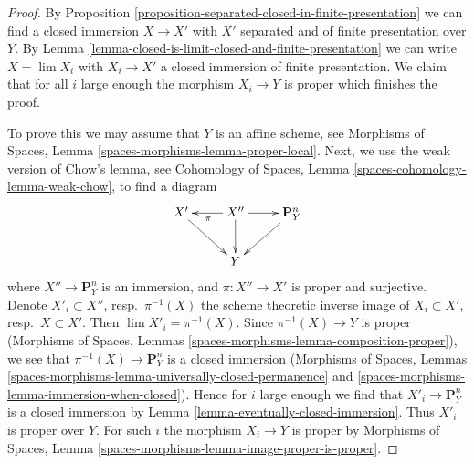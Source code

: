 \documentclass{stacks-project}
\theoremstyle{plain}
\theoremstyle{definition}
\theoremstyle{remark}
\numberwithin{equation}{subsection}
\def\lim{\mathop{\mathrm{lim}}\nolimits}
\begin{document}
\begin{proof}
By Proposition \ref{proposition-separated-closed-in-finite-presentation}
we can find a closed immersion $X \to X'$ with $X'$ separated and of
finite presentation over $Y$. By
Lemma \ref{lemma-closed-is-limit-closed-and-finite-presentation}
we can write $X = \lim X_i$ with $X_i \to X'$ a closed immersion of
finite presentation. We claim that for all $i$ large enough
the morphism $X_i \to Y$ is proper which finishes the proof.

\medskip\noindent
To prove this we may assume that $Y$ is an affine scheme, see
Morphisms of Spaces, Lemma \ref{spaces-morphisms-lemma-proper-local}.
Next, we use the weak version of Chow's lemma, see
Cohomology of Spaces, Lemma \ref{spaces-cohomology-lemma-weak-chow},
to find a diagram
$$
\xymatrix{
X' \ar[rd] & X'' \ar[d] \ar[l]^\pi \ar[r] & \mathbf{P}^n_Y \ar[dl] \\
& Y &
}
$$
where $X'' \to \mathbf{P}^n_Y$ is an immersion, and
$\pi : X'' \to X'$ is proper and surjective. Denote
$X'_i \subset X''$, resp.\ $\pi^{-1}(X)$ the scheme theoretic inverse image of
$X_i \subset X'$, resp.\ $X \subset X'$.
Then $\lim X'_i = \pi^{-1}(X)$. Since $\pi^{-1}(X) \to Y$ is proper
(Morphisms of Spaces, Lemmas \ref{spaces-morphisms-lemma-composition-proper}),
we see that $\pi^{-1}(X) \to \mathbf{P}^n_Y$ is a closed immersion
(Morphisms of Spaces, Lemmas
\ref{spaces-morphisms-lemma-universally-closed-permanence} and
\ref{spaces-morphisms-lemma-immersion-when-closed}).
Hence for $i$ large enough
we find that $X'_i \to \mathbf{P}^n_Y$ is a closed immersion by
Lemma \ref{lemma-eventually-closed-immersion}.
Thus $X'_i$ is proper over $Y$.
For such $i$ the morphism $X_i \to Y$ is proper by
Morphisms of Spaces, Lemma \ref{spaces-morphisms-lemma-image-proper-is-proper}.
\end{proof}
\end{document}
